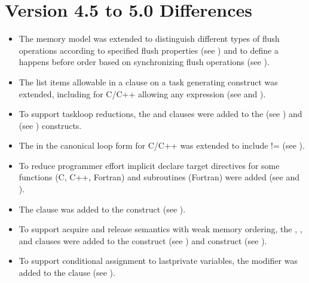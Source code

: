 \section{Version 4.5 to 5.0 Differences}
\label{sec:Version 4.5 to 5.0 Differences}

\begin{itemize}
\item The memory model was extended to distinguish different types of flush
    operations according to specified flush properties (see
    ) and to define a happens before order
    based on synchronizing flush operations (see ).

\item The list items allowable in a  clause on a task generating
      construct was extended, including for C/C++ allowing any  expression (see
       and ).

\item To support taskloop reductions, the  and
 clauses were added to the  (see
) and  (see
) constructs.

\item The  in the canonical loop form for C/C++ was
extended to include != (see ).
  
\item To reduce programmer effort implicit declare target directives for
some functions (C, C++, Fortran) and subroutines (Fortran) were added (see
 and ).

\item The  clause was added to the  construct (see
).

\item To support acquire and release semantics with weak memory ordering, the
    , , and  clauses were added to
    the  construct (see ) and
     construct (see ).

\item To support conditional assignment to lastprivate variables, the
 modifier was added to the  clause (see
).


\end{itemize}
